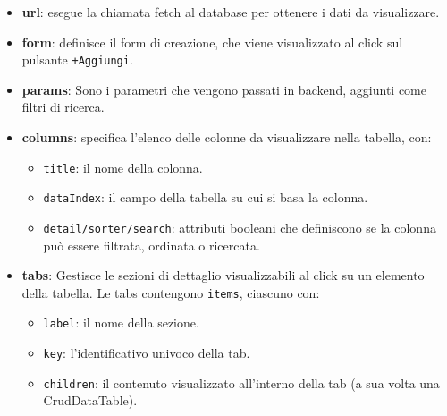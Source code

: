 \begin{itemize}
    \item \textbf{url}: esegue la chiamata fetch al database per ottenere i dati da visualizzare.
    \item \textbf{form}: definisce il form di creazione, che viene visualizzato al click sul pulsante \texttt{+Aggiungi}.
    \item \textbf{params}: Sono i parametri che vengono passati in backend, aggiunti come filtri di ricerca.
    \item \textbf{columns}: specifica l'elenco delle colonne da visualizzare nella tabella, con:
    \begin{itemize}
        \item \texttt{title}: il nome della colonna.
        \item \texttt{dataIndex}: il campo della tabella su cui si basa la colonna.
        \item \texttt{detail/sorter/search}: attributi booleani che definiscono se la colonna può essere filtrata, ordinata o ricercata.
    \end{itemize}
    \item \textbf{tabs}: Gestisce le sezioni di dettaglio visualizzabili al click su un elemento della tabella. Le tabs contengono \texttt{items}, ciascuno con:
    \begin{itemize}
        \item \texttt{label}: il nome della sezione.
        \item \texttt{key}: l'identificativo univoco della tab.
        \item \texttt{children}: il contenuto visualizzato all'interno della tab (a sua volta una CrudDataTable).
    \end{itemize}
\end{itemize}
